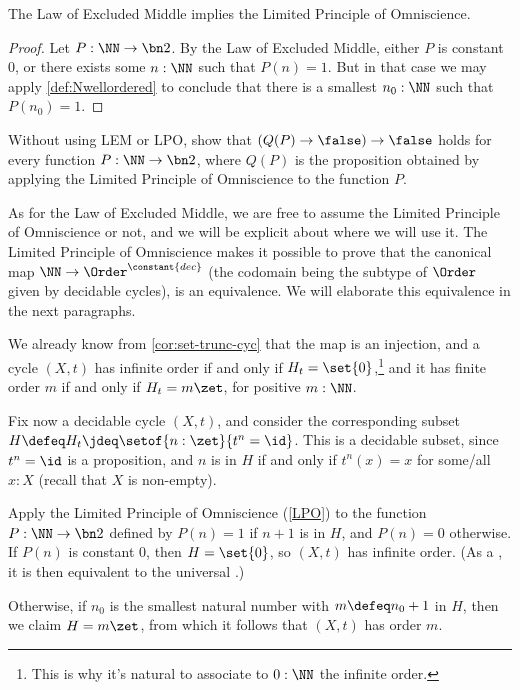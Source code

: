 \begin{lemma}
  The Law of Excluded Middle implies the Limited Principle of Omniscience.
\end{lemma}

\begin{proof}
  Let $P:\NN\to\bn 2$. By the Law of Excluded Middle, either $P$ is constant $0$,
  or there exists some $n:\NN$ such that $P(n)=1$.
  But in that case we may apply \cref{def:Nwellordered}
  to conclude that there is a smallest $n_0:\NN$ such that $P(n_0)=1$.
\end{proof}

\begin{xca}\label{xca:not-not-lpoP}
  Without using LEM or LPO, show that $(Q(P)\to\false)\to\false$ holds
  for every function $P:\NN\to\bn 2$, where $Q(P)$ is the proposition obtained
  by applying the Limited Principle of Omniscience to the function $P$.
\end{xca}

As for the Law of Excluded Middle, we are free to assume the Limited Principle of Omniscience
or not, and we will be explicit about where we will use it.
The Limited Principle of Omniscience makes it possible to prove that the canonical map
$\NN \to \Order^{\constant{dec}}$
(the codomain being the subtype of $\Order$ given by decidable cycles),
is an equivalence.
We will elaborate this equivalence in the next paragraphs.

We already know from \cref{cor:set-trunc-cyc} that the map is an injection,
and a cycle $(X,t)$ has infinite order
if and only if $H_t=\set{0}$,\footnote{%
  This is why it's natural to associate to $0:\NN$
  the infinite order.}
and it has finite order $m$
if and only if $H_t=m\zet$, for positive $m:\NN$.

Fix now a decidable cycle $(X,t)$,
and consider the corresponding subset $H \defeq H_t \jdeq \setof{n:\zet}{t^n=\id}$.
This is a decidable subset, since $t^n=\id$ is a proposition, and $n$ is in $H$
if and only if $t^n(x)=x$ for some/all $x:X$ (recall that $X$ is non-empty).

Apply the Limited Principle of Omniscience (\cref{LPO}) to the function $P:\NN\to\bn 2$ defined
by $P(n)=1$ if $n+1$ is in $H$, and $P(n)=0$ otherwise.
If $P(n)$ is constant $0$, then $H=\set{0}$,
so $(X,t)$ has infinite order.
(As a \covering, it is then equivalent to the universal \covering.)

Otherwise, if $n_0$ is the smallest natural number with $m\defeq n_0+1$ in $H$,
then we claim $H=m\zet$,
from which it follows that $(X,t)$ has order $m$.

